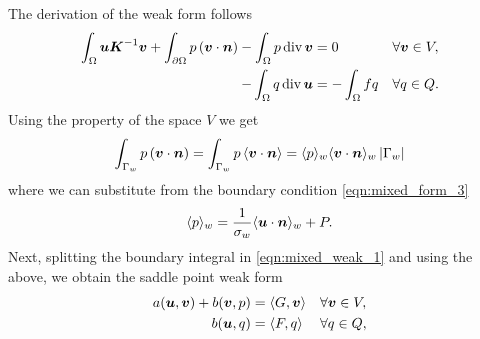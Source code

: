 The derivation of the weak form follows
\begin{align}
    \int_\Omega \mathbf{\boldsymbol{u}} \mathbf{\boldsymbol{K}}^{-1} \mathbf{\boldsymbol{v}}
    + \int_{\partial\Omega} p \,(\mathbf{\boldsymbol{v}} \cdot \mathbf{\boldsymbol{n}})
    - \int_\Omega p\,{\rm div}\, \mathbf{\boldsymbol{v}} &= 0 && \forall \mathbf{\boldsymbol{v}}\in V, \label{eqn:mixed_weak_1}\\
    - \int_\Omega q\,{\rm div}\, \mathbf{\boldsymbol{u}} &= - \int_\Omega fq &&  \forall q\in Q. \label{eqn:mixed_weak_2}
\end{align}
Using the property of the space $V$ we get
\begin{equation}
    \int_{\Gamma_w} p \,(\mathbf{\boldsymbol{v}} \cdot \mathbf{\boldsymbol{n}}) = \int_{\Gamma_w} p \,\langle\mathbf{\boldsymbol{v}} \cdot \mathbf{\boldsymbol{n}}\rangle 
    = \langle p\rangle_w \langle\mathbf{\boldsymbol{v}} \cdot \mathbf{\boldsymbol{n}}\rangle_w \left|\Gamma_w\right|
\end{equation}
where we can substitute from the boundary condition \eqref{eqn:mixed_form_3}
\begin{equation}
    \langle p\rangle_w = \frac{1}{\sigma_w}\langle\mathbf{\boldsymbol{u}}\cdot \mathbf{\boldsymbol{n}}\rangle_w + P.
\end{equation}
Next, splitting the boundary integral in \eqref{eqn:mixed_weak_1} and using the above,
we obtain the saddle point weak form
\begin{align}
    a(\mathbf{\boldsymbol{u}},\mathbf{\boldsymbol{v}}) + b(\mathbf{\boldsymbol{v}}, p) &= \langle G, \mathbf{\boldsymbol{v}}\rangle &&
        \forall \mathbf{\boldsymbol{v}}\in V, \label{eqn:mixed_saddle1}\\
    b(\mathbf{\boldsymbol{u}}, q) &= \langle F, q \rangle &&\forall q \in Q
        \label{eqn:mixed_saddle2},
\end{align}
